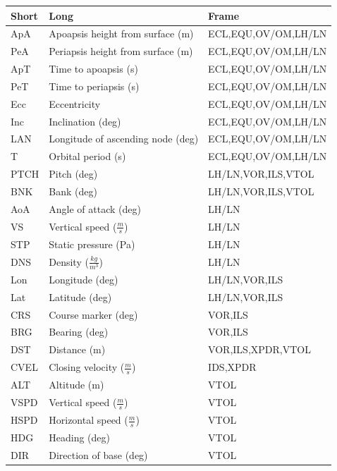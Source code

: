 \documentclass[paper=a4, 11 pt]{report}
\begin{document}
\begin{center}
\begin{tabular}{ |l  l  l| }
  \hline
  \textbf{Short} & \textbf{Long} & \textbf{Frame} \\ \hline
   ApA & Apoapsis height from surface (m) & ECL,EQU,OV/OM,LH/LN \\ \hline
   PeA & Periapsis height from surface (m) & ECL,EQU,OV/OM,LH/LN \\ \hline
   ApT & Time to apoapsis (s) & ECL,EQU,OV/OM,LH/LN \\ \hline
   PeT & Time to periapsis (s) & ECL,EQU,OV/OM,LH/LN \\ \hline
   Ecc & Eccentricity & ECL,EQU,OV/OM,LH/LN \\ \hline
   Inc & Inclination (deg) & ECL,EQU,OV/OM,LH/LN \\ \hline
   LAN & Longitude of ascending node (deg) & ECL,EQU,OV/OM,LH/LN \\ \hline
   T & Orbital period (s) & ECL,EQU,OV/OM,LH/LN \\ \hline
   PTCH & Pitch (deg) & LH/LN,VOR,ILS,VTOL \\ \hline
   BNK & Bank (deg) & LH/LN,VOR,ILS,VTOL \\ \hline
   AoA & Angle of attack (deg) & LH/LN \\ \hline
   VS & Vertical speed ($\frac{m}{s}$) & LH/LN \\ \hline
   STP & Static pressure (Pa) & LH/LN \\ \hline
   DNS & Density ($\frac{kg}{m^3}$) & LH/LN \\ \hline
   Lon & Longitude (deg) & LH/LN,VOR,ILS \\ \hline
   Lat & Latitude (deg) & LH/LN,VOR,ILS \\ \hline
   CRS & Course marker (deg) & VOR,ILS \\ \hline
   BRG & Bearing (deg) & VOR,ILS \\ \hline
   DST & Distance (m) & VOR,ILS,XPDR,VTOL \\ \hline
   CVEL & Closing velocity ($\frac{m}{s}$) & IDS,XPDR \\ \hline
   ALT & Altitude (m) & VTOL \\ \hline
   VSPD & Vertical speed ($\frac{m}{s}$) & VTOL \\ \hline
   HSPD & Horizontal speed ($\frac{m}{s}$) & VTOL \\ \hline
   HDG & Heading (deg) & VTOL \\ \hline
   DIR & Direction of base (deg) & VTOL \\ \hline
\end{tabular}
\end{center}

%
\end{document}
